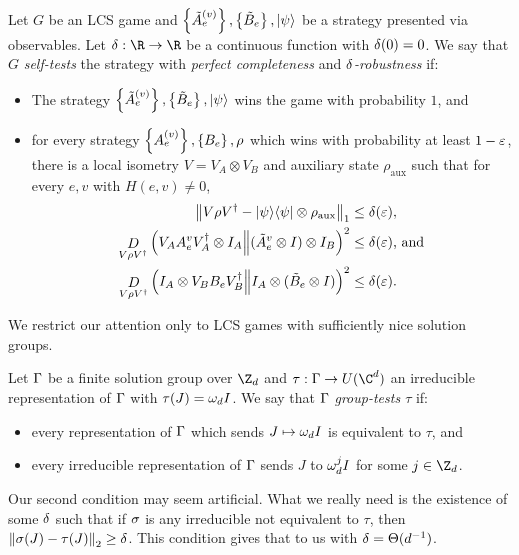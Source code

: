 \begin{definition}\label{defn: robust-self-testing}
	Let $G$ be an LCS game and $\left\{\tilde A_e^{(v)}\right\}, \left\{\tilde B_e\right\}, \ket\psi$ be a strategy presented via observables. Let $\d:\R \to \R$ be a continuous function with $\delta(0) = 0$. We say that $G$ 
	\emph{self-tests} 
	the strategy with
	\emph{perfect completeness}
	and
	\emph{$\delta$-robustness}
	if:
	\begin{itemize}
		\item The strategy $\left\{\tilde A_e^{(v)}\right\}, \left\{\tilde B_e\right\}, \ket\psi$ wins the game with probability $1$, and
		\item for every strategy $\left\{A_e^{(v)}\right\}, \left\{B_e\right\}, \rho$ which wins with probability at least $1-\varepsilon$, there is a local isometry $V = V_A\otimes V_B$ and auxiliary state $\rho_{\text{aux}}$ such that for every $e,v$ with $H(e,v)\neq 0$,
	\begin{align}
		\label{eq:robustness-condition-state}
		\left\Vert V\rho V^\dagger - \ket{\psi}\!\bra{\psi}\otimes \rho_{\text{aux}}\right\Vert_1 &\leq \delta(\varepsilon),\\
		\mathop{D}\limits_{V\rho V^\dagger}\left(V_A A_e^{v}V_A^\dagger\otimes I_A\middle\| (\tilde A_e^{v}\otimes I) \otimes I_B\right)^2 &\leq \delta(\varepsilon)\text{, and}\label{eq:robustness-condition-alice}\\
		\mathop{D}\limits_{V\rho V^\dagger}\left(I_A\otimes V_BB_eV_B^\dagger\middle\| I_A\otimes (\tilde B_e\otimes I)\right)^2 &\leq \delta(\varepsilon).\label{eq:robustness-condition-bob}
	\end{align}

	\end{itemize}
\end{definition}





We restrict our attention only to LCS games with sufficiently nice solution groups.
\begin{definition}\label{definition:group-test}
	Let $\Gamma$ be a finite solution group over $\Z_d$ and $\tau:\G \to U(\C^d)$ an irreducible representation of $\Gamma$ with $\tau(J) = \omega_dI$. We say that $\Gamma$ \emph{group-tests $\tau$}  
	if:
	\begin{itemize}
		\item every representation of $\Gamma$ which sends $J \mapsto \omega_dI$ is equivalent to $\tau$, and
		\item every irreducible representation of $\Gamma$ sends $J$ to $\omega_d^{j}I$ for some $j\in \Z_d$.
	\end{itemize}
\end{definition}
Our second condition may seem artificial. What we really need is the existence of some $\delta$ such that if $\sigma$ is any irreducible not equivalent to $\tau$, then $\left\Vert\sigma(J)-\tau(J)\right\Vert_2 \geq \delta$. This condition gives that to us with $\delta = \Theta(d^{-1})$.



